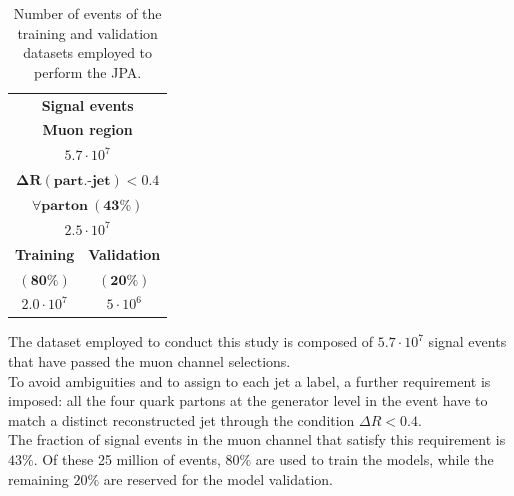 \begin{minipage}{\linewidth}
    \begin{minipage}{0.35\linewidth}
        \begin{table}[H]
            \centering
             \fontsize{11pt}{11pt}\selectfont
            \begin{tabular}{c|c}
            \toprule
                \multicolumn{2}{c}{\textbf{Signal events}}\\
                \multicolumn{2}{c}{\textbf{Muon region}}\\
                \multicolumn{2}{c}{$5.7 \cdot 10^7$}\\
                \midrule
                \multicolumn{2}{c}{$\bm{\Delta R(\textbf{part.-jet})<0.4}$}\\
                \multicolumn{2}{c}{$\forall \textbf{parton} \: \bm{(43\%)}$}\\
                \multicolumn{2}{c}{$2.5 \cdot 10^7$}\\
                \midrule
                 \textbf{Training} & \textbf{Validation}\\
                 $\bm{(80\%)}$ & $\bm{(20\%)}$\\
                 $2.0 \cdot 10^7$& $5\cdot 10^6$\\
                 \bottomrule
            \end{tabular}
            \caption{Number of events of the training and validation datasets employed to perform the JPA.}
            \label{tab:dataset}
        \end{table}
    \end{minipage}
    \hfill
    \begin{minipage}{0.6\linewidth}
    The dataset employed to conduct this study is composed of $5.7 \cdot 10^7$ signal events that have passed the muon channel selections.\\
    To avoid ambiguities and to assign to each jet a label, a further requirement is imposed: all the four quark partons at the generator level in the event have to match a distinct reconstructed jet through the condition $\Delta R<0.4$.\\
    The fraction of signal events in the muon channel that satisfy this requirement is $43\%$. Of these 25 million of events, $80\%$ are used to train the models, while the remaining $20\%$ are reserved for the model validation.       
    \end{minipage}
\end{minipage}

